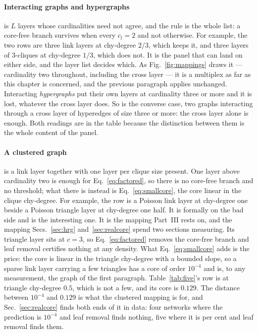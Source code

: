 \paragraph{Interacting graphs and hypergraphs} is $L$ layers whose
cardinalities need not agree, and the rule is the whole list: a core-free branch
survives when every $c_{l}=2$ and not otherwise. For example, the two rows are
three link layers at chy-degree $2/3$, which keeps it, and three layers of
$3$-cliques at chy-degree $1/3$, which does not. It is the panel that can land
on either side, and the layer list decides which. As Fig.~\ref{fig:mappings} draws
it --- cardinality two throughout, including the cross layer --- it is a
multiplex as far as this chapter is concerned, and the previous paragraph
applies unchanged. Interacting \emph{hypergraphs} put their own layers at
cardinality three or more and it is lost, whatever the cross layer does. So is
the converse case, two graphs interacting through a cross layer of hyperedges of
size three or more: the cross layer alone is enough. Both readings are in the
table because the distinction between them is the whole content of the panel.

\paragraph{A clustered graph} is a link layer together with one layer per clique
size present. One layer above cardinality two is enough for
Eq.~\eqref{eq:factored},
so there is no core-free branch and no threshold; what there is instead is
Eq.~\eqref{eq:smallcore}, the core linear in the clique chy-degree. For
example, the row is a Poisson link layer at chy-degree one beside a Poisson
triangle layer at chy-degree one half. It is formally on the bad side and is the
interesting one. It is the mapping Part~III rests on, and the mapping
Secs.~\ref{sec:hrg} and~\ref{sec:realcore} spend two sections measuring. Its
triangle layer sits at $c=3$, so Eq.~\eqref{eq:factored} removes the core-free
branch and leaf removal certifies nothing at any density. What
Eq.~\eqref{eq:smallcore} adds is the price: the core is linear in the triangle
chy-degree with a bounded slope, so a sparse link layer carrying a few triangles
has a core of order $10^{-4}$ and is, to any measurement, the graph of the first
paragraph. Table~\ref{tab:five}'s row is at triangle chy-degree $0.5$, which is
not a few, and its core is $0.129$. The distance between $10^{-4}$ and $0.129$
is what the clustered mapping is for, and Sec.~\ref{sec:realcore} finds both
ends of it in data: four networks where the prediction is $10^{-4}$ and leaf
removal finds nothing, five where it is per cent and leaf removal finds them.

